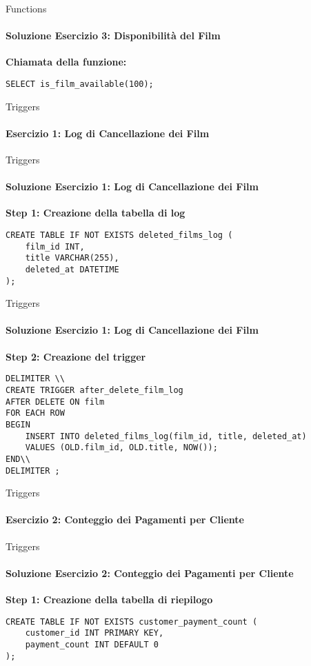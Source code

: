 %
\begin{frame}[fragile]{Functions}
\framesubtitle{Soluzione Esercizio 3: Disponibilit\`a del Film}
\consegnaFunctionsExThree

\vspace{.2cm}

\textbf{Chiamata della funzione:}
\begin{lstlisting}
SELECT is_film_available(100);
\end{lstlisting}
\end{frame}
%
\begin{frame}[fragile]{Triggers}
\framesubtitle{Esercizio 1: Log di Cancellazione dei Film}
\consegnaTriggersExOne
\end{frame}
%
\begin{frame}[fragile]{Triggers}
\framesubtitle{Soluzione Esercizio 1: Log di Cancellazione dei Film}
\consegnaTriggersExOne

\vspace{.5cm}

\textbf{Step 1: Creazione della tabella di log}
\begin{lstlisting}
CREATE TABLE IF NOT EXISTS deleted_films_log (
    film_id INT,
    title VARCHAR(255),
    deleted_at DATETIME
);

\end{lstlisting}

\end{frame}
%
\begin{frame}[fragile]{Triggers}
\framesubtitle{Soluzione Esercizio 1: Log di Cancellazione dei Film}
\consegnaTriggersExOne

\vspace{.2cm}

\textbf{Step 2: Creazione del trigger}
\begin{lstlisting}
DELIMITER \\
CREATE TRIGGER after_delete_film_log
AFTER DELETE ON film
FOR EACH ROW
BEGIN
    INSERT INTO deleted_films_log(film_id, title, deleted_at)
    VALUES (OLD.film_id, OLD.title, NOW());
END\\
DELIMITER ;
\end{lstlisting}

\end{frame}
%
\begin{frame}[fragile]{Triggers}
\framesubtitle{Esercizio 2: Conteggio dei Pagamenti per Cliente}
\consegnaTriggersExTwo
\end{frame}
%
\begin{frame}[fragile]{Triggers}
\framesubtitle{Soluzione Esercizio 2: Conteggio dei Pagamenti per Cliente}

\consegnaTriggersExTwo

\vspace{.5cm}

\textbf{Step 1: Creazione della tabella di riepilogo}
\begin{lstlisting}
CREATE TABLE IF NOT EXISTS customer_payment_count (
    customer_id INT PRIMARY KEY,
    payment_count INT DEFAULT 0
);

\end{lstlisting}

\end{frame}
